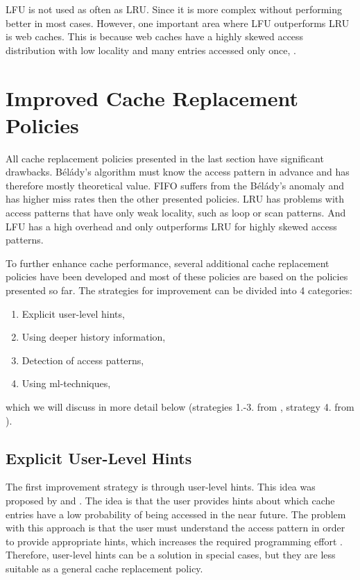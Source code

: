 \documentclass[
	12pt,
	a4paper,
	abstract,
	bibliography=totoc,
	chapterprefix,
	headings=openright,
	numbers=endperiod,
	parskip=half,
	twoside,
]{scrreprt}
\begin{document}
LFU is not used as often as LRU.
Since it is more complex without performing better in most cases.
However, one important area where LFU outperforms LRU is web caches.
This is because web caches have a highly skewed access distribution with low locality and  
many entries accessed only once, \cite{mahanti2000traffic}.

\section{Improved Cache Replacement Policies}
\label{sec:improved cache replacement policies}

All cache replacement policies presented in the last section have significant drawbacks.
Bélády's algorithm must know the access pattern in advance and has therefore mostly theoretical value.
FIFO suffers from the Bélády's anomaly and has higher miss rates then the other presented policies.
LRU has problems with access patterns that have only weak locality, such as loop or scan patterns.
And LFU has a high overhead and only outperforms LRU for highly skewed access patterns. 

To further enhance cache performance, several additional cache replacement policies have been developed and
most of these policies are based on the policies presented so far.
The strategies for improvement can be divided into 4 categories:

\begin{enumerate}
	\setlength\itemsep{-0.8em}
	\item Explicit user-level hints,
	\item Using deeper history information,
	\item Detection of access patterns,
	\item Using ml-techniques,
\end{enumerate}

which we will discuss in more detail below 
(strategies 1.-3. from \cite{10.1145/511399.511340}, strategy 4. from \cite{rodriguez2021learning}).


\subsection{Explicit User-Level Hints}

The first improvement strategy is through user-level hints.
This idea was proposed by \cite{cao1994application} and \cite{patterson1995informed}.
The idea is that the user provides hints about which cache entries have a low probability of being accessed in the near future.
The problem with this approach is that the user must understand the access pattern in order to provide appropriate hints, which increases 
the required programming effort \cite{10.1145/511399.511340}.
Therefore, user-level hints can be a solution in special cases,
but they are less suitable as a general cache replacement policy.
\end{document}
